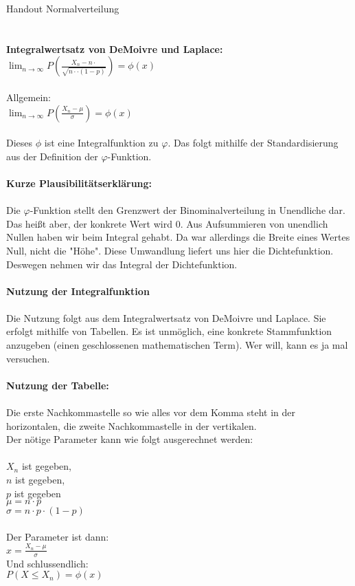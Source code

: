 \documentclass[12pt,a4paper]{article}
\author{Bennet Grützner}
\begin{document}
Handout Normalverteilung
 \\
 \\
 \\
\textbf{Integralwertsatz von DeMoivre und Laplace:}
 \\

$ \lim_{n \rightarrow \infty} P \left(\frac{X_n - n\cdotp}{\sqrt{n\cdotp\cdot(1 - p)}}\right) = \phi(x)$
 \\ 
 \\
Allgemein:
 \\
 
$ \lim_{n \rightarrow \infty} P \left(\frac{X_n - \mu}{\sigma}\right) = \phi(x)$
 \\
 \\
Dieses $\phi$ ist eine Integralfunktion zu $\varphi$. Das folgt mithilfe der Standardisierung aus der Definition der $\varphi$-Funktion. 
 \\
 \\
\textbf{Kurze Plausibilitätserklärung:}
 \\
 \\
Die $\varphi$-Funktion stellt den Grenzwert der Binominalverteilung in Unendliche dar. Das heißt aber, der konkrete Wert wird 0. Aus Aufsummieren von unendlich Nullen haben wir beim Integral gehabt. Da war allerdings die Breite eines Wertes Null, nicht die "Höhe". Diese Umwandlung liefert uns hier die Dichtefunktion. Deswegen nehmen wir das Integral der Dichtefunktion.
 \\
 \\
\textbf{Nutzung der Integralfunktion}
 \\
 \\
Die Nutzung folgt aus dem Integralwertsatz von DeMoivre und Laplace. Sie erfolgt mithilfe von Tabellen. Es ist unmöglich, eine konkrete Stammfunktion anzugeben (einen geschlossenen mathematischen Term). Wer will, kann es ja mal versuchen.
 \\
 \\
\textbf{Nutzung der Tabelle:}
 \\
 \\
Die erste Nachkommastelle so wie alles vor dem Komma steht in der horizontalen, die zweite Nachkommastelle in der vertikalen. 
\\
Der nötige Parameter kann wie folgt ausgerechnet werden:\\
 \\
$X_n$ ist gegeben,\\
$n$ ist gegeben,\\
$p$ ist gegeben\\
$\mu = n \cdot p$\\
$\sigma = n \cdot p \cdot (1 - p)$\\
 \\
Der Parameter ist dann:
 \\
$ x = \frac{X_n - \mu}{\sigma} $
 \\
Und schlussendlich: \\
$ P(X \le X_n) = \phi(x) $
 \\
 \\
\pagebreak
\end{document}
